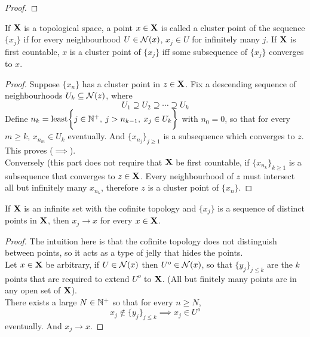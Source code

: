 \documentclass[../../main.tex]{subfiles}
\begin{document}
\begin{wts}
\end{wts}
\begin{proof}
    
\end{proof}
\newpage

\begin{wts}
    If ${\mathbf{X}}$ is a topological space, a point $x\in{\mathbf{X}}$ is called a cluster point of the sequence $\{x_j\}$ if for every neighbourhood $U\in\mathcal{N}(x)$, $x_j\in U$ for infinitely many $j$. If ${\mathbf{X}}$ is first countable, $x$ is a cluster point of $\{x_j\}$ iff some subsequence of $\{x_j\}$ converges to $x$.
\end{wts}
\begin{proof}
    Suppose $\{x_n\}$ has a cluster point in $z\in {\mathbf{X}}$. Fix a descending sequence of neighbourhoods $U_k\subseteq \mathcal{N}(z)$, where
    \[
        U_1\supseteq U_2\supseteq\cdots\supseteq U_k
    \]
    Define $n_k = \operatorname{least}\biggl\{{j\in \mathbb{N}^+,\: j>n_{k-1},\: x_j\in U_k}\biggr\}
    $ with $n_0=0$, so that for every $m\geq k$, $x_{n_m}\in U_k$ eventually. And $\{x_{n_j}\}_{j\geq 1}$ is a subsequence which converges to $z$. This proves ($\implies$).\\
    
    Conversely (this part does not require that ${\mathbf{X}}$ be first countable, if $\{x_{n_k}\}_{k\geq 1}$ is a subsequence that converges to $z\in{\mathbf{X}}$. Every neighbourhood of $z$ must intersect all but infinitely many $x_{n_k}$, therefore $z$ is a cluster point of $\{x_n\}$.
\end{proof}
\newpage




\begin{wts}
    If ${\mathbf{X}}$ is an infinite set with the cofinite topology and $\{x_j\} $ is a sequence of distinct points in ${\mathbf{X}}$, then $x_j\to x$ for every $x\in{\mathbf{X}}$.   
\end{wts}
\begin{proof}
    The intuition here is that the cofinite topology does not distinguish between points, so it acts as a type of jelly that hides the points.\\

    Let $x\in{\mathbf{X}}$ be arbitrary, if $U\in\mathcal{N}(x)$ then $U^o\in\mathcal{N}(x)$, so that $\{y_j\}_{j\leq k}$ are the $k$ points that are required to extend $U^o$ to ${\mathbf{X}}$. (All but finitely many points are in any open set of ${\mathbf{X}}$).\\

    There exists a large $N\in\mathbb{N}^+$ so that for every $n\geq N$, 
    \[
        x_j\notin\{y_j\}_{j\leq k}\implies x_j\in U^o
    \]
    eventually. And $x_j\to x$.
\end{proof}
\newpage
\end{document}
